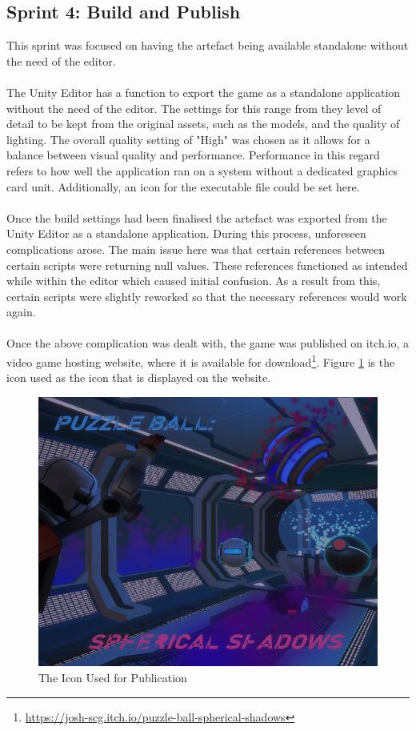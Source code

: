 \subsection{Sprint 4: Build and Publish}
This sprint was focused on having the artefact being available standalone without the need of the editor.
\\\\
The Unity Editor has a function to export the game as a standalone application without the need of the editor. The settings for this range from they level of detail to be kept from the original assets, such as the models, and the quality of lighting. The overall quality setting of "High" was chosen as it allows for a balance between visual quality and performance. Performance in this regard refers to how well the application ran on a system without a dedicated graphics card unit. Additionally, an icon for the executable file could be set here.
\\\\
Once the build settings had been finalised the artefact was exported from the Unity Editor as a standalone application. During this process, unforeseen complications arose. The main issue here was that certain references between certain scripts were returning null values. These references functioned as intended while within the editor which caused initial confusion. As a result from this, certain scripts were slightly reworked so that the necessary references would work again. 
\\\\
Once the above complication was dealt with, the game was published on itch.io, a video game hosting website, where it is available for download\footnote{\url{https://josh-scg.itch.io/puzzle-ball-spherical-shadows}}. Figure \ref{thumb} is the icon used as the icon that is displayed on the website. 

\begin{figure}[H]
\centering
\includegraphics[scale=0.6]{Figures/thumb.png}
\caption{The Icon Used for Publication}
\label{thumb}
\end{figure}

